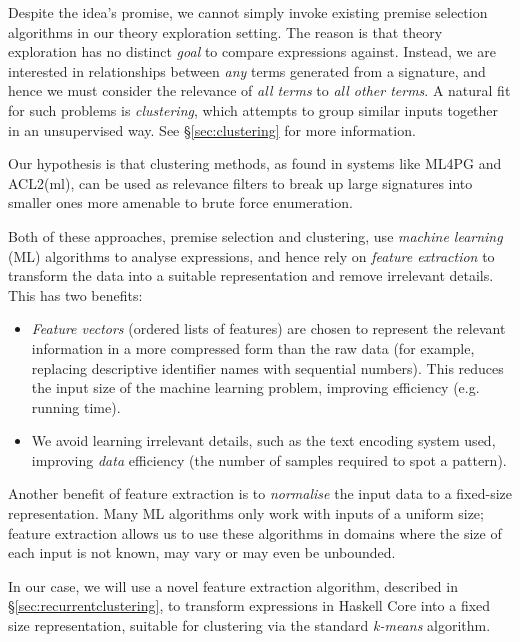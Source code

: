 Despite the idea's promise, we cannot simply invoke existing premise selection algorithms in our theory exploration setting. The reason is that theory exploration has no distinct \emph{goal} to compare expressions against. Instead, we are interested in relationships between \emph{any} terms generated from a signature, and hence we must consider the relevance of \emph{all terms} to \emph{all other terms}. A natural fit for such problems is \emph{clustering}, which attempts to group similar inputs together in an unsupervised way. See \S \ref{sec:clustering} for more information.

Our hypothesis is that clustering methods, as found in systems like ML4PG and ACL2(ml), can be used as relevance filters to break up large signatures into smaller ones more amenable to brute force enumeration.

\iffalse TODO: I would play up the clustering intelligence. Clustering is not just about breaking up, it is about discovering significant patterns in data. By forgetting this, you make motivation for your work sound too ``small'' \fi

Both of these approaches, premise selection and clustering, use \emph{machine learning} (ML) algorithms to analyse expressions, and hence rely on \emph{feature extraction} to transform the data into a suitable representation and remove irrelevant details. This has two benefits:

\begin{itemize}
  \item \emph{Feature vectors} (ordered lists of features) are chosen to represent the relevant information in a more compressed form than the raw data (for example, replacing descriptive identifier names with sequential numbers). This reduces the input size of the machine learning problem, improving efficiency (e.g. running time).
  \item We avoid learning irrelevant details, such as the text encoding system used, improving \emph{data} efficiency (the number of samples required to spot a pattern).
\end{itemize}

Another benefit of feature extraction is to \emph{normalise} the input data to a fixed-size representation. Many ML algorithms only work with inputs of a uniform size; feature extraction allows us to use these algorithms in domains where the size of each input is not known, may vary or may even be unbounded.

In our case, we will use a novel feature extraction algorithm, described in \S \ref{sec:recurrentclustering}, to transform expressions in Haskell Core into a fixed size representation, suitable for clustering via the standard \emph{k-means} algorithm.

